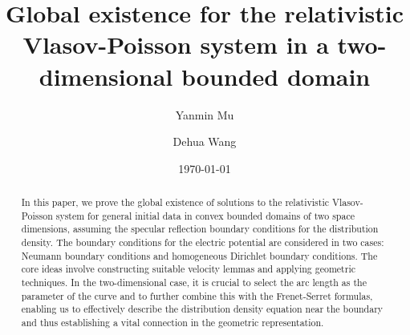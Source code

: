 \documentclass[11pt,reqno]{amsart}%
\date{\today}
\theoremstyle{definition}
\theoremstyle{remark}
\begin{document}
\title[a kinetic model]
 {Global existence for the relativistic Vlasov-Poisson system in a two-dimensional bounded domain} %


  \author[Y.-M. Mu ]{Yanmin Mu}
\address{Department of Applied Mathematics, Nanjing University of Finance \& Economics, Nanjing
 210046, China}


 \author[D. Wang]{Dehua Wang}%
\address{Department of Mathematics,   University of Pittsburgh,  Pittsburgh, PA 15260, USA}

\date{}

\begin{abstract}
In this paper, we prove the global existence of solutions to the relativistic Vlasov-Poisson system for general initial data in convex bounded domains of two space dimensions, assuming the specular reflection boundary conditions for the distribution density. The boundary conditions for the electric potential are considered in two cases: Neumann boundary conditions and homogeneous Dirichlet boundary conditions. The core ideas involve constructing suitable velocity lemmas and applying geometric techniques. In the two-dimensional case, it is crucial to select the arc length as the parameter of the curve and to further combine this with the Frenet-Serret formulas, enabling us to effectively describe the distribution density equation near the boundary and thus establishing a vital connection in the geometric representation. 
 \end{abstract}




\maketitle


\end{document}
